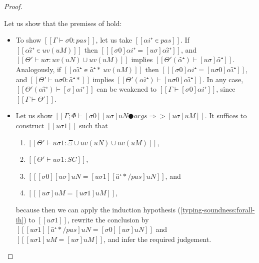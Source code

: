 \begin{proof}
\begin{caseof}
\begin{enumerate}
                    Let us show that the premises of 
                     hold:
                    \begin{itemize}
                        \item To show $[[Γ ⊢ σ0 :{pas}]]$,
                            let us take $[[αi⁺ ∊ {pas}]]$.
                            If $[[ αî⁺ ∊ uv(uM)]]$
                            then $[[ [σ0]αi⁺ = [uσ]αî⁺ ]]$,
                            and $[[ Θ' ⊢ uσ : uv(uN) ∪ uv(uM) ]]$
                            implies $[[Θ'(α̂⁺) ⊢ [uσ]α̂⁺]]$.
                            Analogously, if $[[ αî⁺ ∊ {â⁺*} \ uv(uM)]]$
                            then $[[ [σ0]αi⁺ = [uσ0]αî⁺ ]]$,
                            and $[[Θ' ⊢ uσ0 : {â⁺*}]]$ implies $[[Θ'(αî⁺) ⊢ [uσ0]αî⁺]]$.
                            In any case, $[[Θ'(αî⁺) ⊢ [σ]αi⁺ ]]$
                            can be weakened to $[[Γ ⊢ [σ0]αi⁺]]$, 
                            since $[[Γ ⊢ Θ']]$.

                        \item Let us show $[[Γ; Φ ⊢ [σ0][uσ]uN ● args ⇒> [uσ]uM ]]$.
                            It suffices to construct $[[uσ1]]$ such that
                            \begin{enumerate}
                                \item $[[Θ' ⊢ uσ1 : Ξ ∪ uv(uN) ∪ uv(uM)]]$,
                                \item $[[Θ' ⊢ uσ1 : SC]]$,
                                \item $[[ [σ0][uσ]uN = [uσ1][â⁺*/pas]uN]]$, and
                                \item $[[ [uσ]uM = [uσ1]uM]]$,
                            \end{enumerate}
                            because then we can apply the induction hypothesis
                            (\ref{typing-soundness:forall-ih}) to
                            $[[uσ1]]$, rewrite the conclusion by 
                            $[[ [uσ1][â⁺*/pas]uN = [σ0][uσ]uN]]$ and
                            $[[ [uσ1]uM = [uσ]uM]]$, and infer the required judgement.


\end{itemize}
\end{enumerate}
\end{caseof}
\end{proof}
